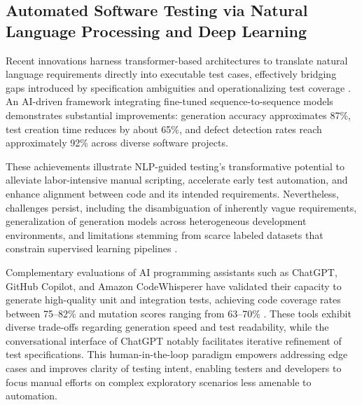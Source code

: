 \documentclass[sigconf]{acmart}
\begin{document}
\subsection{Automated Software Testing via Natural Language Processing and Deep Learning}

Recent innovations harness transformer-based architectures to translate natural language requirements directly into executable test cases, effectively bridging gaps introduced by specification ambiguities and operationalizing test coverage \cite{ref30}. An AI-driven framework integrating fine-tuned sequence-to-sequence models demonstrates substantial improvements: generation accuracy approximates 87\%, test creation time reduces by about 65\%, and defect detection rates reach approximately 92\% across diverse software projects.

These achievements illustrate NLP-guided testing's transformative potential to alleviate labor-intensive manual scripting, accelerate early test automation, and enhance alignment between code and its intended requirements. Nevertheless, challenges persist, including the disambiguation of inherently vague requirements, generalization of generation models across heterogeneous development environments, and limitations stemming from scarce labeled datasets that constrain supervised learning pipelines \cite{ref30}.

Complementary evaluations of AI programming assistants such as ChatGPT, GitHub Copilot, and Amazon CodeWhisperer have validated their capacity to generate high-quality unit and integration tests, achieving code coverage rates between 75--82\% and mutation scores ranging from 63--70\% \cite{ref32}. These tools exhibit diverse trade-offs regarding generation speed and test readability, while the conversational interface of ChatGPT notably facilitates iterative refinement of test specifications. This human-in-the-loop paradigm empowers addressing edge cases and improves clarity of testing intent, enabling testers and developers to focus manual efforts on complex exploratory scenarios less amenable to automation.
\end{document}
